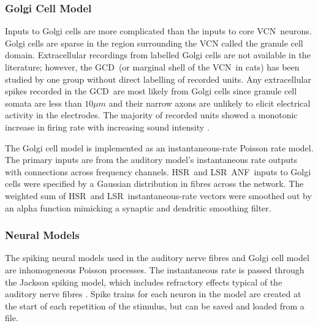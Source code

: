 \subsubsection{Golgi Cell Model}

Inputs to Golgi cells are more complicated than the inputs to core
VCN~neurons.  Golgi cells are sparse in the region surrounding the
VCN called the granule cell domain.  Extracellular recordings from
labelled Golgi cells are not available in the literature; however,
the GCD~(or marginal shell of the VCN~in cats) has been studied by
one group \cite{GhoshalKim:1997} without direct labelling of
recorded units.  Any extracellular spikes recorded in the GCD~are
most likely from Golgi cells since granule cell somata are less
than $10 \mu{m}$ and their narrow axons are unlikely to elicit
electrical activity in the electrodes.  The majority of recorded
units showed a monotonic increase in firing rate with increasing
sound intensity \cite{GhoshalKim:1997}.

The Golgi cell model is implemented as an instantaneous-rate
Poisson rate model.  The primary inputs are from the auditory
model's instantaneous rate outputs with connections across
frequency channels.  HSR~and LSR~ANF~inputs to Golgi cells were
specified  by a Gaussian distribution in fibres across the network.
The weighted sum of HSR~and LSR~instantaneous-rate vectors were
smoothed out by an alpha function mimicking a synaptic and
dendritic smoothing filter.

\subsubsection{Neural Models}

The spiking neural models used in the auditory nerve fibres and
Golgi cell model are inhomogeneous Poisson processes.  The
instantaneous rate is passed through the Jackson spiking model,
which includes refractory effects typical of the auditory nerve
fibres \cite{Jackson:2003,JacksonCarney:2005}.  Spike trains for
each neuron in the model are created at the start of each
repetition of the stimulus, but can be saved and loaded from a file.



